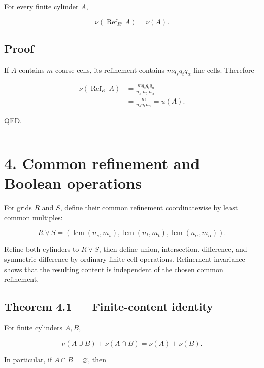 For every finite cylinder \(A\),

\[
\boxed{
\nu(\operatorname{Ref}_{R'}A)=\nu(A).
}
\tag{3.3}
\]

\hypertarget{proof}{%
\subsection{Proof}\label{proof}}

If \(A\) contains \(m\) coarse cells, its refinement contains
\(mq_sq_tq_\alpha\) fine cells. Therefore

\[
\begin{aligned}
\nu(\operatorname{Ref}_{R'}A)
&=
\frac{mq_sq_tq_\alpha}
{n_s'n_t'n_\alpha'}\\
&=
\frac{m}{n_sn_tn_\alpha}
=
u(A).
\end{aligned}
\]

QED.

\begin{center}\rule{0.5\linewidth}{0.5pt}\end{center}

\hypertarget{common-refinement-and-boolean-operations}{%
\section{4. Common refinement and Boolean operations}\label{common-refinement-and-boolean-operations}}

For grids \(R\) and \(S\), define their common refinement coordinatewise by
least common multiples:

\[
R\vee S
=
(\operatorname{lcm}(n_s,m_s),
 \operatorname{lcm}(n_t,m_t),
 \operatorname{lcm}(n_\alpha,m_\alpha)).
\tag{4.1}
\]

Refine both cylinders to \(R\vee S\), then define union, intersection,
difference, and symmetric difference by ordinary finite-cell operations.
Refinement invariance shows that the resulting content is independent of the
chosen common refinement.

\hypertarget{theorem-4.1-finite-content-identity}{%
\subsection{Theorem 4.1 --- Finite-content identity}\label{theorem-4.1-finite-content-identity}}

For finite cylinders \(A,B\),

\[
\boxed{
\nu(A\cup B)+\nu(A\cap B)=\nu(A)+\nu(B).
}
\tag{4.2}
\]

In particular, if \(A\cap B=\varnothing\), then


